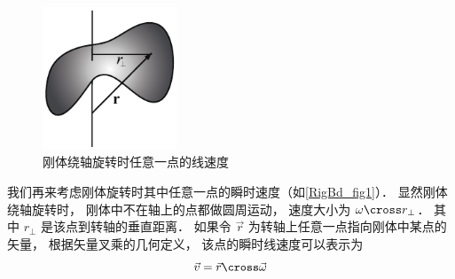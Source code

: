 \begin{figure}[ht]
\centering
\includegraphics[width=4cm]{./figures/RigBd1.pdf}
\caption{刚体绕轴旋转时任意一点的线速度} \label{RigBd_fig1}
\end{figure}

我们再来考虑刚体旋转时其中任意一点的瞬时速度（如\autoref{RigBd_fig1}）． 显然刚体绕轴旋转时， 刚体中不在轴上的点都做圆周运动， 速度大小为 $\omega \cross r_{\bot}$． 其中 $r_{\bot}$ 是该点到转轴的垂直距离． 如果令 $\vec r$ 为转轴上任意一点指向刚体中某点的矢量， 根据矢量叉乘的几何定义， 该点的瞬时线速度可以表示为
\begin{equation}
\vec v = \vec r \cross \vec \omega
\end{equation}
